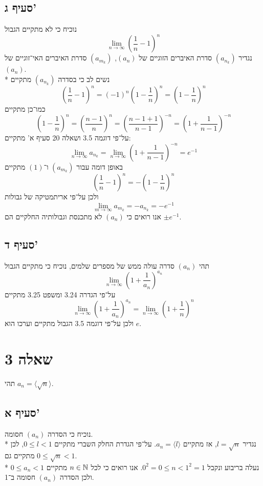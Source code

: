 \subsection{סעיף ג'}
נוכיח כי לא מתקיים הגבול
\[
	\lim_{n \to \infty} \left( \frac{1}{n} - 1 \right)^n
\]
נגדיר $(a_{n_k})$ סדרת האיברים הזוגיים של $(a_n)$, $(a_{m_k})$ סדרת האיברים האי־זוגיים של $(a_n)$. \\*
נשים לב כי בסדרה $(a_{n_k})$ מתקיים
\[
	\left( \frac{1}{n} - 1 \right)^n
	= (-1)^n \left( 1 - \frac{1}{n} \right)^n
	= \left( 1 - \frac{1}{n} \right)^n
	\tag{1}
\]
כמו־כן מתקיים
\[
	\left( 1 - \frac{1}{n} \right)^n
	= \left( \frac{n - 1}{n} \right)^n
	= \left( \frac{n - 1 + 1}{n - 1} \right)^{-n}
	= \left( 1 + \frac{1}{n - 1} \right)^{-n}
\]
על־פי דוגמה 3.5 ושאלה 20 סעיף א' מתקיים:
\[
	\lim_{n \to \infty} a_{n_k}
	= \lim_{n \to \infty} \left( 1 + \frac{1}{n - 1} \right)^{-n}
	= e^{-1}
\]
באופן דומה עבור $(a_{m_k})$ ו־$(1)$ מתקיים
\[
	\left( \frac{1}{n} - 1 \right)^n
	= -\left( 1 - \frac{1}{n} \right)^n
\]
ולכן על־פי אריתמטיקה של גבולות
\[
	\lim_{m \to \infty} a_{m_k} = - a_{n_k} = -e^{-1}
\]
אנו רואים כי $(a_n)$ לא מתכנסת וגבולותיה החלקיים הם $\pm e^{-1}$.

\subsection{סעיף ד'}
תהי $(a_n)$ סדרה עולה ממש של מספרים שלמים, נוכיח כי מתקיים הגבול
\[
	\lim_{n \to \infty} \left( 1 + \frac{1}{a_n} \right)^{a_n}
\]
על־פי הגדרה 3.24 ומשפט 3.25 מתקיים
\[
	\lim_{n \to \infty} \left( 1 + \frac{1}{a_n} \right)^{a_n}
	= \lim_{n \to \infty} \left( 1 + \frac{1}{n} \right)^{n}
\]
ולכן על־פי דוגמה 3.5 הגבול מתקיים וערכו הוא $e$.

\section{שאלה 3}
תהי $a_n = \langle \sqrt{n} \rangle$.
\subsection{סעיף א'}
נוכיח כי הסדרה $(a_n)$ חסומה. \\*
נגדיר $l = \sqrt{n}$, אז מתקיים $a_n = \langle l \rangle$. על־פי הגדרת החלק השברי מתקיים $0 \le l < 1$, לכן מתקיים גם $0 \le \sqrt{n} < 1$. \\*
נעלה בריבוע ונקבל $0^2 = 0 \le n < 1^2 = 1$. אנו רואים כי לכל $n \in \mathbb{N}$ מתקיים $0 \le a_n < 1$ ולכן הסדרה $(a_n)$ חסומה ב־1.


